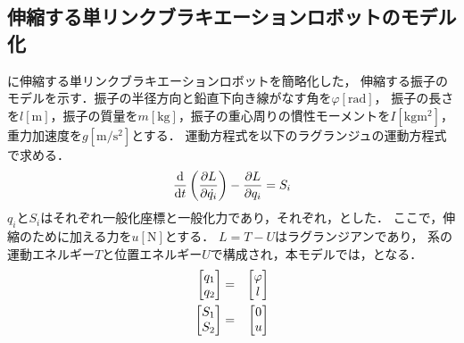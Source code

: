           \subsection{伸縮する単リンクブラキエーションロボットのモデル化}
          に伸縮する単リンクブラキエーションロボットを簡略化した，
          伸縮する振子のモデルを示す．振子の半径方向と鉛直下向き線がなす角を$\varphi [\mathrm{rad}]$，
          振子の長さを$l [\mathrm{m}]$，振子の質量を$m [\mathrm{kg}]$，振子の重心周りの慣性モーメントを$I [\mathrm{kg}\mathrm{m}^2]$，
          重力加速度を$g [\mathrm{m}/\mathrm{s}^2]$とする．
          運動方程式を以下のラグランジュの運動方程式で求める．
          \begin{eqnarray}
            \equlabel{Lagrange}
            \frac{\mathrm{d}}{\mathrm{d}t}\left(\frac{\partial L}{\partial \dot{q_i}}\right)-\frac{\partial L}{\partial q_i}=S_i
            \end{eqnarray} 
          $q_i$と$S_i$はそれぞれ一般化座標と一般化力であり，それぞれ，とした．
          ここで，伸縮のために加える力を$u[\mathrm{N}]$とする．
          $L=T-U$はラグランジアンであり，
          系の運動エネルギー$T$と位置エネルギー$U$で構成され，本モデルでは，となる．
          \begin{eqnarray}
              \equlabel{qq}
              \begin{bmatrix}
                q_1 \\
                q_2 \\
                \end{bmatrix}
              &=&
              \begin{bmatrix}
                \varphi \\
                l \\
                \end{bmatrix}\\
              \equlabel{SS}
              \begin{bmatrix}
                S_1 \\
                S_2 \\
                \end{bmatrix}
              &=&
              \begin{bmatrix}
                0 \\
                u \\
                \end{bmatrix}
                \end{eqnarray}
